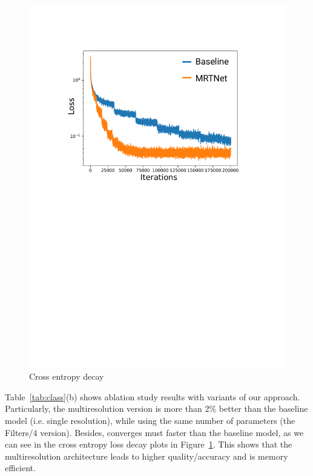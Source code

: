 \setlength{\intextsep}{0pt}%
\setlength{\columnsep}{0pt}%
\begin{figure} 
\includegraphics[width=1.0\linewidth]{MRTNet/imgs/convergence_loss.pdf}
\vspace{-20pt}
\caption{\small Cross entropy decay \label{fig:convergence}}
\end{figure} 
Table~\ref{tab:class}(b) shows ablation study results with variants of our approach.
Particularly, the multiresolution version is more than $2\%$ better than the baseline model (i.e. single resolution), 
while using the same number of parameters (the Filters/4 version). 
Besides, \mrtnet converges must faster than the baseline model, as we can see in the cross entropy loss decay plots in Figure~\ref{fig:convergence}. 
This shows that the multiresolution architecture leads to higher quality/accuracy and is memory efficient. 

